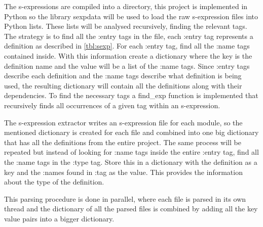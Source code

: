 The s-expressions are compiled into a directory, this project is implemented in
Python so the library sexpdata will be used to load the raw s-expression files
into Python lists. These lists will be analysed recursively, finding the
relevant tags. The strategy is to find all the :entry tags in the file, each
:entry tag represents a definition as described in \cref{tbl:sexp}. For
each :entry tag, find all the :name tags contained inside. With this
information create a dictionary where the key is the definition name and the
value will be a list of the :name tags. Since :entry tags describe each
definition and the :name tags describe what definition is being used, the
resulting dictionary will contain all the definitions along with their
dependencies. To find the necessary tags a \textsf{find\_exp} function is
implemented that recursively finds all occurrences of a given tag within an
s-expression.

The s-expression extractor writes an s-expression file for each module, so the
mentioned dictionary is created for each file and combined into one
big dictionary that has all the definitions from the entire project. The same
process will be repeated but instead of looking for :name tags inside the
entire :entry tag, find all the :name tags in the :type tag. Store this
in a dictionary with the definition as a key and the :names found in :tag as
the value. This provides the information about the type of the definition.

This parsing procedure is done in parallel, where each file is parsed in its
own thread and the dictionary of all the parsed files is combined by
adding all the key value pairs into a bigger dictionary.


